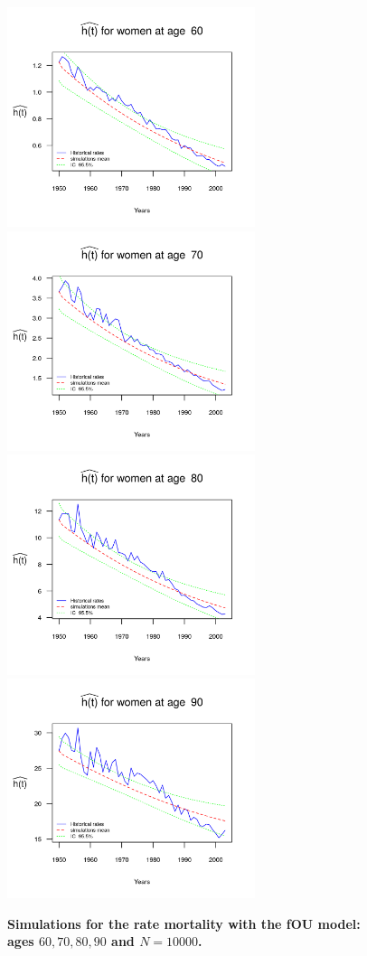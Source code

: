 \documentclass[smallextended]{svjour3}
\begin{document}
\begin{figure}[H]
    \includegraphics[width = 2.85in]{PlotWomen60.png}
    \includegraphics[width = 2.85in]{PlotWomen70.png}
    \includegraphics[width = 2.85in]{PlotWomen80.png}
    \includegraphics[width = 2.85in]{PlotWomen90.png}
    \caption{\bf Simulations for the rate mortality with the fOU model: ages
    $60,70,80,90$ and $N=10000$.}
    \label{graph-simu_FOU2}
\end{figure}\vspace*{0.1cm}
\end{document}

